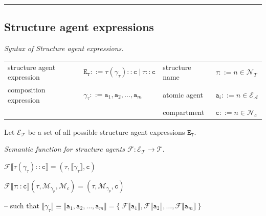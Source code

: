 \documentclass{elsarticle}
\begin{document}

\noindent\rule{\textwidth}{1pt}

\subsection{Structure agent expressions}

\begin{definition}\label{structure_syntax}
\textit{Syntax of Structure agent expressions.}

\begin{center}
{\small
\begin{tabular}{ l l l l }
 structure agent expression & $\mathtt{E}_\mathtt{T} ::= \tau(\gamma_\tau)::\mathtt{c} ~|~ \tau::\mathtt{c}$ & structure name & $\tau ::= n \in \mathcal{N}_{T}$\\
 composition expression & $\gamma_\tau ::= \mathtt{a}_1, \mathtt{a}_2, \ldots, \mathtt{a}_m$ & atomic agent & $\mathtt{a}_i ::= n \in \mathcal{E}_\mathcal{A}$\\
 & & compartment & $\mathtt{c} ::= n \in \mathcal{N}_{c}$\\
\end{tabular}
}
\end{center}   
\end{definition}

\begin{definition}
Let $\mathcal{E}_\mathcal{T}$ be a set of all possible structure agent expressions $\mathtt{E}_\mathtt{T}$.
\end{definition}

\begin{definition}
\textit{Semantic function for structure agents $\mathcal{F}: \mathcal{E}_\mathcal{T} \rightarrow \mathcal{T}$.}

\begin{center}
$\mathcal{F} \llbracket \tau(\gamma_\tau)::\mathtt{c} \rrbracket = (\tau, \llbracket \gamma_\tau \rrbracket, \mathtt{c})$

$\mathcal{F} \llbracket \tau::\mathtt{c} \rrbracket (\tau, \mathcal{M}_{\gamma_p}, \mathcal{M}_c) = (\tau, \mathcal{M}_{\gamma_p}, \mathtt{c})$

\bigskip

-- such that $\llbracket \gamma_\tau \rrbracket \equiv \llbracket \mathtt{a}_1, \mathtt{a}_2, \ldots, \mathtt{a}_m \rrbracket = \{~ \mathcal{F} \llbracket \mathtt{a}_1 \rrbracket, \mathcal{F} \llbracket \mathtt{a}_2 \rrbracket, \ldots, \mathcal{F} \llbracket \mathtt{a}_m \rrbracket ~\}$

\end{center}

\end{definition}
\end{document}
